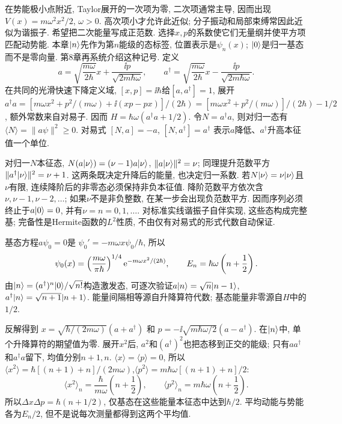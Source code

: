 在势能极小点附近, Taylor展开的一次项为零, 二次项通常主导, 因而出现 $V(x)=m\omega^2x^2/2$, $\omega>0$. 高次项小才允许此近似; 分子振动和局部束缚常因此近似为谐振子. 希望把二次能量写成正范数. 选择$x,p$的系数使它们无量纲并使平方项匹配动势能. 本章$\lvert n\rangle$先作为第$n$能级的态标签, 位置表示是$\psi_n(x)$; $\lvert 0\rangle$是归一基态而不是零向量. 第8章再系统介绍这种记号. 定义
\[
a=\sqrt{\frac{m\omega}{2\hbar}}x+\frac{\ii p}{\sqrt{2m\hbar\omega}},
\qquad a^\dagger=\sqrt{\frac{m\omega}{2\hbar}}x-\frac{\ii p}{\sqrt{2m\hbar\omega}}.
\]
在共同的光滑快速下降定义域, $[x,p]=\ii\hbar$给$[a,a^\dagger]=1$, 展开$a^\dagger a=[m\omega x^2+p^2/(m\omega)+\ii(xp-px)]/(2\hbar)=[m\omega x^2+p^2/(m\omega)]/(2\hbar)-1/2$, 额外常数来自对易子. 因而 $H=\hbar\omega(a^\dagger a+1/2)$. 令$N=a^\dagger a$, 则对归一态有$\langle N\rangle=\|a\psi\|^2\ge0$. 对易式 $[N,a]=-a$, $[N,a^\dagger]=a^\dagger$ 表示$a$降低、$a^\dagger$升高本征值一个单位.

对归一$N$本征态, $N(a\lvert \nu\rangle)=(\nu-1)a\lvert \nu\rangle$, $\lVert a\lvert \nu\rangle\rVert^2=\nu$; 同理提升范数平方$\lVert a^\dagger\lvert \nu\rangle\rVert^2=\nu+1$. 这两条既决定升降后的能量, 也决定归一系数. 若$N\lvert \nu\rangle=\nu\lvert \nu\rangle$且$\nu$有限, 连续降阶后的非零态必须保持非负本征值. 降阶范数平方依次含$\nu,\nu-1,\nu-2,\ldots$; 如果$\nu$不是非负整数, 在某一步会出现负范数平方. 因而序列必须终止于$a\lvert 0\rangle=0$, 并有$\nu=n=0,1,\ldots$. 对标准实线谐振子自伴实现, 这些态构成完整基; 完备性是Hermite函数的$L^2$性质, 不由仅有对易式的形式代数自动保证.

基态方程$a\psi_0=0$是 $\psi_0'=-m\omega x\psi_0/\hbar$, 所以
\[
\psi_0(x)=\left(\frac{m\omega}{\pi\hbar}\right)^{1/4}
\mathrm e^{-m\omega x^2/(2\hbar)},\qquad E_n=\hbar\omega\left(n+\frac12\right).
\]
由$\lvert n\rangle=(a^\dagger)^n\lvert 0\rangle/\sqrt{n!}$构造激发态, 可逐次验证$a\lvert n\rangle=\sqrt n\lvert n-1\rangle$, $a^\dagger\lvert n\rangle=\sqrt{n+1}\lvert n+1\rangle$. 能量间隔相等源自升降算符代数; 基态能量非零源自$H$中的$1/2$.

反解得到 $x=\sqrt{\hbar/(2m\omega)}(a+a^\dagger)$ 和 $p=-\ii\sqrt{m\hbar\omega/2}(a-a^\dagger)$. 在$\lvert n\rangle$中, 单个升降算符的期望值为零. 展开$x^2$后, $a^2$和$(a^\dagger)^2$也把态移到正交的能级; 只有$a a^\dagger$和$a^\dagger a$留下, 均值分别$n+1,n$. $\langle x\rangle=\langle p\rangle=0$, 所以$\langle x^2\rangle=\hbar[(n+1)+n]/(2m\omega)$,$\langle p^2\rangle=m\hbar\omega[(n+1)+n]/2$:
\[
\langle x^2\rangle_n=\frac{\hbar}{m\omega}\left(n+\frac12\right),
\qquad \langle p^2\rangle_n=m\hbar\omega\left(n+\frac12\right).
\]
所以$\Delta x\Delta p=\hbar(n+1/2)$, 仅基态在这些能量本征态中达到$\hbar/2$. 平均动能与势能各为$E_n/2$, 但不是说每次测量都得到这两个平均值.

